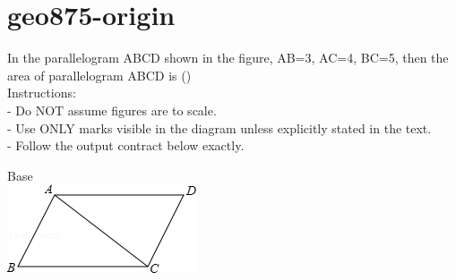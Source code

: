\documentclass[12pt]{article}
\begin{document}
\section*{geo875-origin}
\noindent\begin{minipage}{\textwidth}
\setlength{\parskip}{4pt}
In the parallelogram ABCD shown in the figure, AB=3, AC=4, BC=5, then the area of parallelogram ABCD is ()\\
Instructions:\\
- Do NOT assume figures are to scale.\\
- Use ONLY marks visible in the diagram unless explicitly stated in the text.\\
- Follow the output contract below exactly.\\
\end{minipage}
\begin{center}
\begin{minipage}{0.32\textwidth}\centering
Base\\
\includegraphics[width=0.95\linewidth]{out_rommath_origin/items/geo875-origin/assets/figure.png}
\end{minipage}
\par
\end{center}
\bigskip
\end{document}
